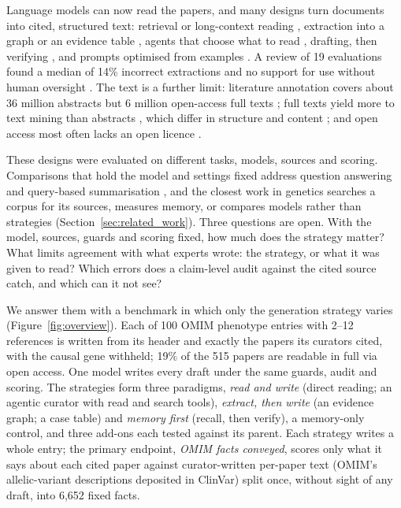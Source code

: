 \documentclass{article} %
\begin{document}
Language models can now read the papers, and many designs turn documents into cited, structured text: retrieval \citep{Lewis2020RetrievalaugmentedGeneration} or long-context reading \citep{li2024retrieval}, extraction into a graph \citep{edge2024local} or an evidence table \citep{joshi2026sliders}, agents that choose what to read \citep{Lla2023PaperqaRetrievalaugmented,skarlinski2024language}, drafting, then verifying \citep{dhuliawala2024chainofverification}, and prompts optimised from examples \citep{agrawal2026gepa}. A review of 19 evaluations found a median of 14\% incorrect extractions and no support for use without human oversight \citep{Clark2025GenerativeArtificial}. The text is a further limit: literature annotation covers about 36 million abstracts but 6 million open-access full texts \citep{wei2024pubtator}; full texts yield more to text mining than abstracts \citep{Westergaard2018ComprehensiveQuantitative,Wei2019PubtatorCentral}, which differ in structure and content \citep{Cohen2010StructuralContent}; and open access most often lacks an open licence \citep{Piwowar2018StateOa}.

These designs were evaluated on different tasks, models, sources and scoring. Comparisons that hold the model and settings fixed address question answering and query-based summarisation \citep{li2024retrieval,Li2025LaraBenchmarking,han2025rag}, and the closest work in genetics searches a corpus for its sources, measures memory, or compares models rather than strategies (Section~\ref{sec:related_work}). Three questions are open. With the model, sources, guards and scoring fixed, how much does the strategy matter? What limits agreement with what experts wrote: the strategy, or what it was given to read? Which errors does a claim-level audit against the cited source catch, and which can it not see?

We answer them with a benchmark in which only the generation strategy varies (Figure~\ref{fig:overview}). Each of 100 OMIM phenotype entries with 2--12 references is written from its header and exactly the papers its curators cited, with the causal gene withheld; 19\% of the 515 papers are readable in full via open access. One model writes every draft under the same guards, audit and scoring. The strategies form three paradigms, \emph{read and write} (direct reading; an agentic curator with read and search tools), \emph{extract, then write} (an evidence graph; a case table) and \emph{memory first} (recall, then verify), a memory-only control, and three add-ons each tested against its parent. Each strategy writes a whole entry; the primary endpoint, \emph{OMIM facts conveyed}, scores only what it says about each cited paper against curator-written per-paper text (OMIM's allelic-variant descriptions deposited in ClinVar) split once, without sight of any draft, into 6,652 fixed facts.
\end{document}
